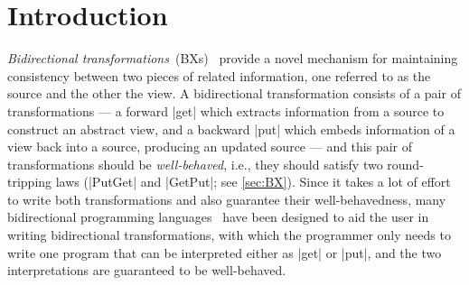 \documentclass[fleqn]{llncs}
\renewcommand{\emph}{\textsl}
\begin{document}
\section{Introduction}
\label{sec:introduction}


\emph{Bidirectional transformations}~(BXs)~\cite{GRACE:09} provide a novel mechanism for maintaining consistency between two pieces of related information, one referred to as the source and the other the view.
A bidirectional transformation consists of a pair of transformations ---
a forward |get| which extracts information from a source to construct an abstract view,
and a backward |put| which embeds information of a view back into a source, producing an updated source --- and this pair of transformations should be \emph{well-behaved}, i.e., they should satisfy two round-tripping laws (|PutGet| and |GetPut|; see \autoref{sec:BX}).
Since it takes a lot of effort to write both transformations and also guarantee their well-behavedness,
many bidirectional programming languages~\cite{Foster-lenses,Bohannon:06,MHNHT07,Hidaka:10,PachecoCunha:10,Barbosa:2010,Hofmann:2011,FoPP08,HoPW12} have been designed
to aid the user in writing bidirectional transformations,
with which the programmer only needs to write one program that can be interpreted either as |get| or |put|, and the two interpretations are guaranteed to be well-behaved.
\end{document}
